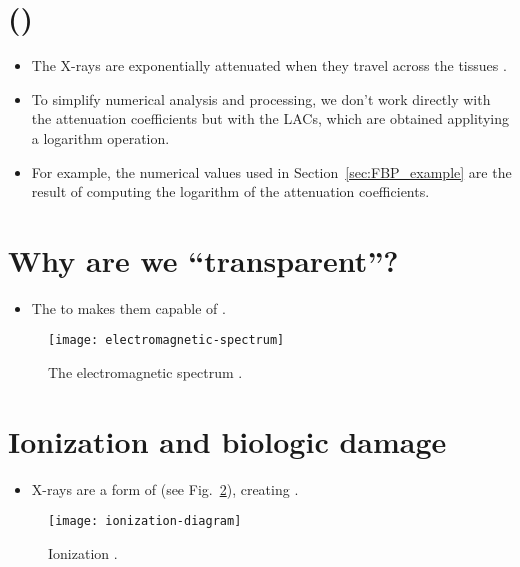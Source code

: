 \section{ ()}
\begin{itemize}
\item The X-rays are
  exponentially attenuated when they travel across the tissues \cite{wikipedia_LAC}.
\item To simplify numerical analysis and processing, we don't work
  directly with the attenuation coefficients but with the \glspl{LAC}, which
  are obtained applitying a logarithm operation.
\item For example, the numerical values used in
  Section~\ref{sec:FBP_example} are the result of computing the
  logarithm of the 
  attenuation coefficients.
\end{itemize}

\section{Why are we ``transparent''?}
\begin{itemize}
\item The  to  makes them capable of .
\end{itemize}
\vspace{-4ex}
\begin{figure}[!h]
  \centering
  \texttt{[image: electromagnetic-spectrum]}
  \caption{The electromagnetic spectrum
    \cite{X-rays_in_spectrum}.\label{fig:X-rays_in_spectrum}}
\end{figure}

\section{Ionization and biologic damage}
\begin{itemize}
\item X-rays are a form of  (see Fig.~\ref{fig:ionization}), creating
  .
\end{itemize}
\vspace{-3ex}
\begin{figure}[!h]
  \centering
  \texttt{[image: ionization-diagram]}
  \caption{Ionization
    \cite{Perakende_ionization}.\label{fig:ionization}}
\end{figure}

